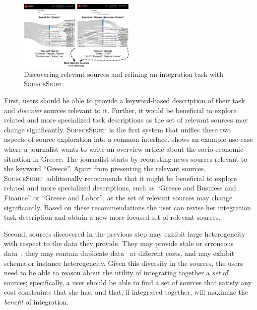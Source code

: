 \documentclass{vldb}
\newcommand\system{\textsc{SourceSight}}
\begin{document}
\begin{figure}
	\begin{center}
	\includegraphics[trim=0 0 0 60, clip,width=0.50\textwidth]{fig/exploreCor}
	\vspace{-20pt}
	\caption{Discovering relevant sources and refining an integration task with \system.}
	\label{fig:exploration}
	\end{center}
	\vspace{-25pt}
\end{figure}


First, users should be able to provide a keyword-based description of their task and {\em discover} sources relevant to it. Further, it would be beneficial to explore related and more specialized task descriptions as the set of relevant sources may change significantly. \system~is the first system that unifies these two aspects of source exploration into  a common interface.  shows an example use-case where a journalist wants to write an overview article about the socio-economic situation in Greece. The journalist starts by requesting news sources relevant to the keyword ``Greece''. Apart from presenting the relevant sources, \system~additionally recommends that it might be beneficial to explore related and more specialized descriptions, such as ``Greece and Business and Finance'' or ``Greece and Labor'', as the set of relevant sources may change significantly. Based on these recommendations the user can revise her integration task description and obtain a new more focused set of relevant sources.

Second, sources discovered in the previous step may exhibit large heterogeneity with respect to the data they provide. They may provide stale or erroneous data~\cite{Dong_vldb:2009, li:2012}, they may contain duplicate data~\cite{bronzi:2013, li:2012} at different costs, and may exhibit schema or instance heterogeneity. Given this diversity in the sources, the users need to be able to reason about the utility of integrating together a {\em set} of sources; specifically, a user should be able to find a set of sources that satisfy any cost constraints that she has, and that, if integrated together, will maximize the {\em benefit} of integration. %
\end{document}
